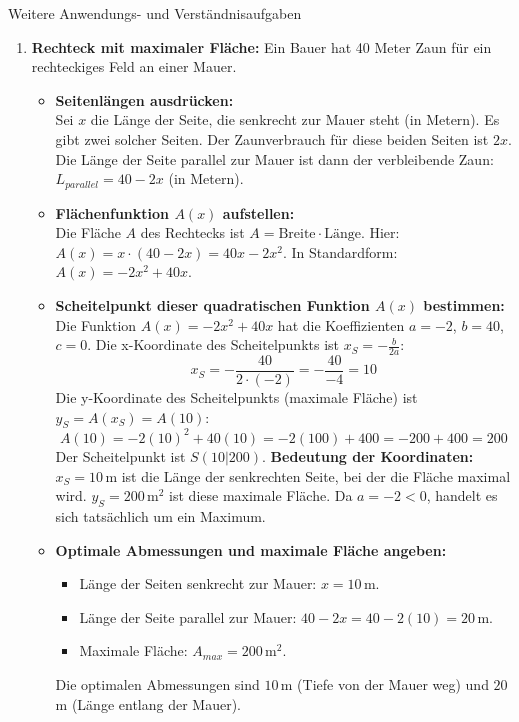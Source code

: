 \begin{loesungsumgebung}{Weitere Anwendungs- und Verständnisaufgaben}

\begin{enumerate}
    \item \textbf{Rechteck mit maximaler Fläche:}
    Ein Bauer hat 40 Meter Zaun für ein rechteckiges Feld an einer Mauer.
    \begin{itemize}
        \item \textbf{Seitenlängen ausdrücken:} \\
        Sei $x$ die Länge der Seite, die senkrecht zur Mauer steht (in Metern). Es gibt zwei solcher Seiten. Der Zaunverbrauch für diese beiden Seiten ist $2x$.
        Die Länge der Seite parallel zur Mauer ist dann der verbleibende Zaun: $L_{parallel} = 40 - 2x$ (in Metern).

        \item \textbf{Flächenfunktion $A(x)$ aufstellen:} \\
        Die Fläche $A$ des Rechtecks ist $A = \text{Breite} \cdot \text{Länge}$. Hier:
        $A(x) = x \cdot (40 - 2x) = 40x - 2x^2$.
        In Standardform: $A(x) = -2x^2 + 40x$.

        \item \textbf{Scheitelpunkt dieser quadratischen Funktion $A(x)$ bestimmen:} \\
        Die Funktion $A(x) = -2x^2 + 40x$ hat die Koeffizienten $a=-2$, $b=40$, $c=0$.
        Die x-Koordinate des Scheitelpunkts ist $x_S = -\frac{b}{2a}$:
        $$ x_S = -\frac{40}{2 \cdot (-2)} = -\frac{40}{-4} = 10 $$
        Die y-Koordinate des Scheitelpunkts (maximale Fläche) ist $y_S = A(x_S) = A(10)$:
        $$ A(10) = -2(10)^2 + 40(10) = -2(100) + 400 = -200 + 400 = 200 $$
        Der Scheitelpunkt ist $S(10|200)$.
        \textbf{Bedeutung der Koordinaten:} $x_S=10\,$m ist die Länge der senkrechten Seite, bei der die Fläche maximal wird. $y_S=200\,$m$^2$ ist diese maximale Fläche. Da $a=-2 < 0$, handelt es sich tatsächlich um ein Maximum.

        \item \textbf{Optimale Abmessungen und maximale Fläche angeben:}
        \begin{itemize}
            \item Länge der Seiten senkrecht zur Mauer: $x = 10\,$m.
            \item Länge der Seite parallel zur Mauer: $40 - 2x = 40 - 2(10) = 20\,$m.
            \item Maximale Fläche: $A_{max} = 200\,$m$^2$.
        \end{itemize}
        Die optimalen Abmessungen sind $10\,$m (Tiefe von der Mauer weg) und $20\,$m (Länge entlang der Mauer).
    \end{itemize}


\end{enumerate}
\end{loesungsumgebung}
